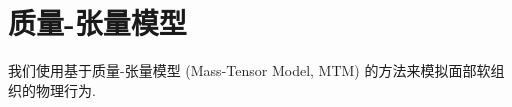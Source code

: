 
\chapter{质量-张量模型}

我们使用基于质量-张量模型 (Mass-Tensor Model, MTM) \cite{cotinHybridElasticModel2000} 的方法来模拟面部软组织的物理行为.
